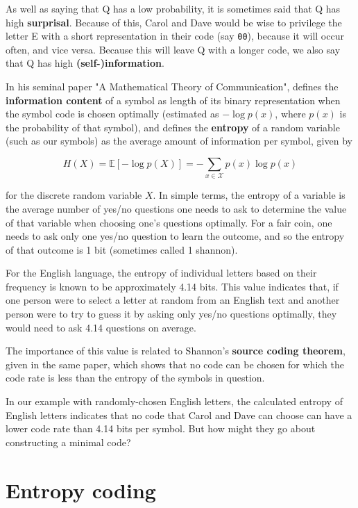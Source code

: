 As well as saying that Q has a low probability, it is sometimes said that Q has high \textbf{surprisal}. Because of this, Carol and Dave would be wise to privilege the letter E with a short representation in their code (say \texttt{00}), because it will occur often, and vice versa. Because this will leave Q with a longer code, we also say that Q has high \textbf{(self-)information}.

In his seminal paper "A Mathematical Theory of Communication", \textcite{shannon1948mathematical} defines the \textbf{information content} of a symbol as length of its binary representation when the symbol code is chosen optimally (estimated as $-\log p(x)$, where $p(x)$ is the probability of that symbol), and defines the \textbf{entropy} of a random variable (such as our symbols) as the average amount of information per symbol, given by

\[H(X) = \mathbb{E}[-\log p(X)] = -\sum_{x \in \mathcal{X}} p(x) \log p(x)\]

for the discrete random variable $X$. In simple terms, the entropy of a variable is the average number of yes/no questions one needs to ask to determine the value of that variable when choosing one's questions optimally. For a fair coin, one needs to ask only one yes/no question to learn the outcome, and so the entropy of that outcome is 1 bit (sometimes called 1 shannon).

For the English language, the entropy of individual letters based on their frequency is known to be approximately 4.14 bits. This value indicates that, if one person were to select a letter at random from an English text and another person were to try to guess it by asking only yes/no questions optimally, they would need to ask 4.14 questions on average.

The importance of this value is related to Shannon's \textbf{source coding theorem}, given in the same paper, which shows that no code can be chosen for which the code rate is less than the entropy of the symbols in question.

In our example with randomly-chosen English letters, the calculated entropy of English letters indicates that no code that Carol and Dave can choose can have a lower code rate than 4.14 bits per symbol. But how might they go about constructing a minimal code?

\section{Entropy coding}

